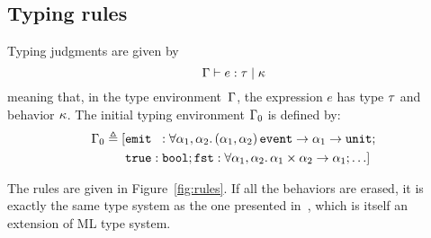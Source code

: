 \documentclass[9pt,preprint]{sigplanconf}
\newcommand{\deq}{\triangleq}
\begin{document}
\subsection{Typing rules}

Typing judgments are given by 
\[ \Gamma \vdash e : \tau \mid \kappa \] 
meaning that, in the type environment~$\Gamma$, the expression $e$ has type $\tau$ and behavior $\kappa$. The initial typing environment $\Gamma_0$ is defined by: 
\begin{align*}
\Gamma_0 \deq [
 &\eemit{}{} : \forall  \rtvar_1, \rtvar_2. \, 
        \rtarrow{ \rtsig{\rtvar_1}{\rtvar_2} }{\rtarrow{\rtvar_1}{\unit{}} }; \\
        &\mathtt{true} : \mathtt{bool};
              \mathtt{fst} : \forall \rtvar_1, \rtvar_2.\, \rtarrow{\rtprod{\rtvar_1}{\rtvar_2}}{\rtvar_1};  \ldots ]
\end{align*}

\begin{figure*}
\begin{small}

\end{small}

\caption{Type-and-effect rules}
\label{fig:rules}
\end{figure*}

The rules are given in Figure~\ref{fig:rules}. If all the behaviors are erased, it is exactly the same type system as the one presented in~\cite{Mandel:2005}, which is itself an extension of ML type system. 
\end{document}
